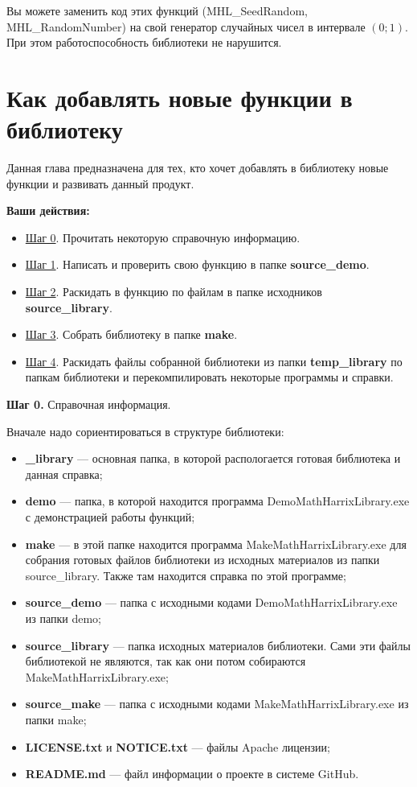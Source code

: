 \documentclass[a4paper,12pt]{article}
\begin{document}
Вы можете заменить код этих функций (MHL\_SeedRandom, MHL\_RandomNumber) на свой генератор случайных чисел в интервале $\left( 0; 1\right)$. При этом работоспособность библиотеки не нарушится.

\newpage
\section{Как добавлять новые функции в библиотеку}\label{section_addnew}

Данная глава предназначена для тех, кто хочет добавлять в библиотеку новые функции и развивать данный продукт.

\textbf{Ваши действия:}

\begin{itemize}
\item \hyperref[step0]{Шаг 0}. Прочитать некоторую справочную информацию.
\item \hyperref[step1]{Шаг 1}. Написать и проверить свою функцию в папке \textbf{source\_demo}.
\item \hyperref[step2]{Шаг 2}. Раскидать в функцию по файлам в папке исходников \textbf{source\_library}.
\item \hyperref[step3]{Шаг 3}. Собрать библиотеку в папке \textbf{make}.
\item \hyperref[step4]{Шаг 4}. Раскидать файлы собранной библиотеки из папки \textbf{temp\_library} по папкам библиотеки и перекомпилировать некоторые программы и справки.
\end{itemize}

\textbf{Шаг 0.} \label{step0} Справочная информация.

Вначале надо сориентироваться в структуре библиотеки:
\begin{itemize}
\item \textbf{\_library} --- основная папка, в которой распологается готовая библиотека и данная справка;
\item \textbf{demo} --- папка, в которой находится программа DemoMathHarrixLibrary.exe с демонстрацией работы функций;
\item \textbf{make} --- в этой папке находится программа MakeMathHarrixLibrary.exe для собрания готовых файлов библиотеки из исходных материалов из папки source\_library. Также там находится справка по этой программе;
\item \textbf{source\_demo} --- папка с исходными кодами DemoMathHarrixLibrary.exe из папки demo;
\item \textbf{source\_library} --- папка исходных материалов библиотеки. Сами эти файлы библиотекой не являются, так как они потом собираются MakeMathHarrixLibrary.exe; 
\item \textbf{source\_make} --- папка с исходными кодами MakeMathHarrixLibrary.exe из папки make;
\item \textbf{LICENSE.txt} и \textbf{NOTICE.txt} --- файлы Apache лицензии;
\item \textbf{README.md} --- файл информации о проекте в системе GitHub.
\end{itemize}
\end{document}
